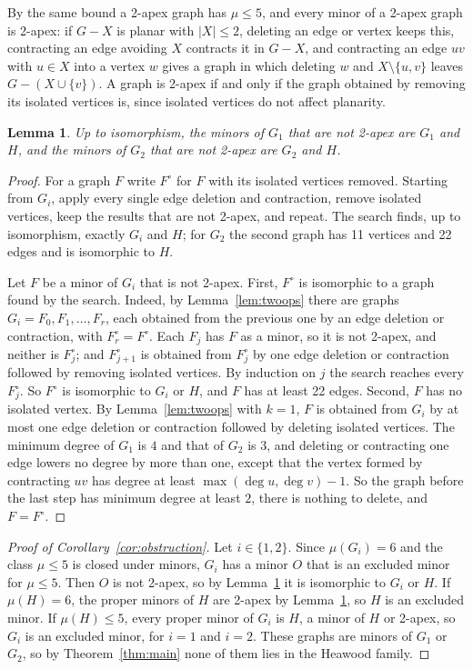 \documentclass[11pt]{article}
\newtheorem{lemma}[theorem]{Lemma}
\theoremstyle{remark}
\begin{document}
By the same bound a 2-apex graph has $\mu\le5$, and every minor of a
2-apex graph is 2-apex: if $G-X$ is planar with $|X|\le2$, deleting an
edge or vertex keeps this, contracting an edge avoiding $X$ contracts it in
$G-X$, and contracting an edge $uv$ with $u\in X$ into a vertex $w$ gives a
graph in which deleting $w$ and $X\setminus\{u,v\}$ leaves
$G-(X\cup\{v\})$. A graph is 2-apex if and only if the graph obtained by
removing its isolated vertices is, since isolated vertices do not affect
planarity.

\begin{lemma}\label{lem:nonapex}
Up to isomorphism, the minors of $G_1$ that are not 2-apex are $G_1$ and
$H$, and the minors of $G_2$ that are not 2-apex are $G_2$ and $H$.
\end{lemma}

\begin{proof}
For a graph $F$ write $F^\circ$ for $F$ with its isolated vertices removed.
Starting from $G_i$, apply every single edge deletion and contraction,
remove isolated vertices, keep the results that are not 2-apex, and repeat.
The search finds, up to isomorphism, exactly $G_i$ and $H$; for $G_2$ the
second graph has 11 vertices and 22 edges and is isomorphic to $H$.

Let $F$ be a minor of $G_i$ that is not 2-apex. First, $F^\circ$ is
isomorphic to a graph found by the search. Indeed, by
Lemma~\ref{lem:twoops} there are graphs $G_i=F_0,F_1,\dots,F_r$, each
obtained from the previous one by an edge deletion or contraction, with
$F_r^\circ=F^\circ$. Each $F_j$ has $F$ as a minor, so it is not 2-apex,
and neither is $F_j^\circ$; and $F_{j+1}^\circ$ is obtained from
$F_j^\circ$ by one edge deletion or contraction followed by removing
isolated vertices. By induction on $j$ the search reaches every
$F_j^\circ$. So $F^\circ$ is isomorphic to $G_i$ or $H$, and $F$ has at
least 22 edges. Second, $F$ has no isolated vertex. By
Lemma~\ref{lem:twoops} with $k=1$, $F$ is obtained from $G_i$ by at most
one edge deletion or contraction followed by deleting isolated vertices.
The minimum degree of $G_1$ is $4$ and that of $G_2$ is $3$, and deleting
or contracting one edge lowers no degree by more than one, except that the
vertex formed by contracting $uv$ has degree at least
$\max(\deg u,\deg v)-1$. So the graph before the last step has minimum
degree at least $2$, there is nothing to delete, and $F=F^\circ$.
\end{proof}

\begin{proof}[Proof of Corollary~\ref{cor:obstruction}]
Let $i\in\{1,2\}$. Since $\mu(G_i)=6$ and the class $\mu\le5$ is closed
under minors, $G_i$ has a minor $O$ that is an excluded minor for
$\mu\le5$. Then $O$ is not 2-apex, so by Lemma~\ref{lem:nonapex} it is
isomorphic to $G_i$ or $H$. If $\mu(H)=6$, the proper minors of $H$ are
2-apex by Lemma~\ref{lem:nonapex}, so $H$ is an excluded minor. If
$\mu(H)\le5$, every proper minor of $G_i$ is $H$, a minor of $H$ or 2-apex,
so $G_i$ is an excluded minor, for $i=1$ and $i=2$. These graphs are
minors of $G_1$ or $G_2$, so by Theorem~\ref{thm:main} none of them lies in
the Heawood family.
\end{proof}
\end{document}
